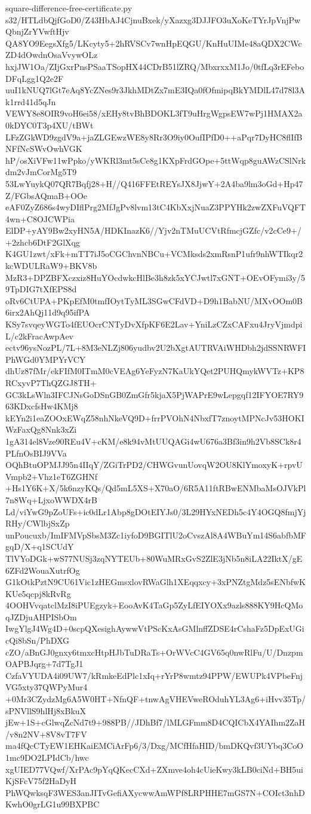 \documentclass[11pt]{article}
\theoremstyle{definition}
\theoremstyle{remark}
\begin{document}
\begin{filecontents*}[overwrite]{square-difference-free-certificate.py}
s32/HTLdbQjfGoD0/Z43HbAJ4CjnuBxek/yXazxg3DJJFO3uXoKeTYrJpVnjPwQbnjZrYVwftHjv
QA8YO9EegsXfg5/LKcyty5+2hRVSCv7wnHpEQGU/KnHuUIMe48aQDX2CWcZD4dOwdnOsaVvywOLz
hxjJW1Oa/ZIjGxrPnsPSaaTSopHX44CDrB51lZRQ/MbxrxxM1Jo/0tfLq3rEFeboDFqLgg1Q2e2F
uuI1kNUQ7lGt7eAq8YcZNes9r3JkhMDtZx7mE3IQa0fOfmipqBkYMDlL47d78l3Ak1rrd41d5qJn
VEWY8e8OIR9voH6ei58/xEHy8tvBhBDOKL3fT9uHrgWgpsEW7wPj1HMAX2a0kDYC0T3p4XU/tBWt
LFzZGkWD9zgdV9a+jaZLGEwzWE8y8Rr3O9iy0OufIPfD0++aPqr7DyHC8flIfBNFfNcSWvOwhVGK
hP/osXiVFw11wPpko/yWKRl3mt5sCe8g1KXpFrdGOpe+5ttWqp8guAWzCSlNrkdm2vJmCorMg5T9
53LwYuykQ07QR7Bqfj28+H//Q416FFEtREYsJX8JjwY+2A4ba9lm3oGd+Hp47Z/FGbsAQmaB+OOe
eAF0ZyZ686s4wyDIflPrg2MfJgPv8lvm13tC4KbXxjNuaZ3PPYHk2zwZXFuVQFT4wn+C8OJCWPia
ElDP+yAY9Bw2xyHN5A/HDKInazK6//Yjv2nTMuUCVtRfmcjGZfc/v2cCe9+/+2zhcb6DtF2GlXqg
K4GU1zwt/xFk+mTT7iJ5oCGChvnNBCu+VCMksds2xmRsnP1ufr9nhWTIkqr2kcWDULRaW9+BKV8b
MzR3+DPZBFXczxiz8HuYOcdwkcHlBe3h8zk5xYCJwtl7xGNT+OEvOFymi3y/59TpDIG7tXfEPS8d
oRv6CtUPA+PKpEfM0tmfIOytTyML3SGwCFdVD+D9h1BabNU/MXvOOm0B6irx2AhQj11d9q95ifPA
KSy7svqeyWGTo4fEUOcrCNTyDvXfpKF6E2Lav+YniLzCZxCAFxu4JryVjmdpiL/c2kFracAwpAev
ectv96ysNozPL/7L+8M3eNLZj806yudbv2U2bXgtAUTRVAiWHDbh2jdSSNRWFIPhWGd0YMPYrVCY
dhUz87fMr/ekFIfM0ITmM0cVEAg6YeFyzN7KaUkYQet2PUHQmykWVTz+KP8RCxyvP7ThQZGJ8TH+
GC3kLsWln3IFCJNsGoDSnGB0ZmGfr5kjaX5PjWAPrE9wLepgqf12IFYOE7RY963KDxcfsHw4KMj8
kEYn2i1eaZOOxEWqZ58nhNkeVQ9D+frrPVOhN4NbxfT7znoytMPNcJv53HOKIWzFaxQg8Nnk3xZi
1gA314el8Vze90REu4V+cKM/e8k94vMtUUQAGi4wU676a3Bf3in9h2Vb8SCk8r4PLfnOsBIJ9VVa
OQhBtuOPMJJ95n4IIqY/ZGiTrPD2/CHWGvunUovqW2OU8KlYmoxyK+rpvUVmpb2+Vhz1eT6ZGHNf
+Hs1Y6K+X/5k6nzyKQs/Qd5mL5XS+X70aO/6R5A11ftRBwENMbaMsOJVkPl7n8Wq+LjxoWWDX4rB
Ld/viYwG9pZoUFs+ic0dLr1Abp8gDOtEIYJs0/3L29HYxNEDh5c4Y4OGQ8fmjYjRHy/CWlbjSxZp
unPoucuxb/ImIFMVpSbsM3Zc1iyfoD9BGITlU2oCvszAl8A4WBuYm14S6abfbMFgqD/X+q1SCUdY
TlVYoDGk+wS77NUSj3zqNYTEUb+80WuMRxGvS2ZlE3jNb5n8iLA22IktX/gE6ZFd2WouaXutrfOg
G1kOtkPztN9CU61Vic1zHEGmsxlovRWaGlh1XEqqxcy+3xPNZtgMdz5sENbfwKKUe5qcpj8kRvRg
4OOHVvqatclMzI8iPUEgzyk+EooAvK4TaGp5ZyLfEIYOXx9azls888KY9HcQMoqJZDjuAHPISbOm
IwgYlgJ4Wg4D+0scpQXesighAywwVtPScKxAsGMlnffZDSE4rCshaFz5DpExUGicQi8bSn/PhDXG
cZO/aBnGJ0gnxy6tmxcHtpHJbTuDRaTs+OrWVcC4GV65q0nwRlFu/U/DnzpmOAPBJqrg+7d7TgJ1
CzfaVYUDA4i09UW7/kRmkeEdPlc1xIq+rYrP8wmtz94PPW/EWUPk4VPbeFnjVG5xty37QWPyMur4
+0Mr3CZydzMg6A5W0HT+NfnQF+tnwAgVHEVweROduhYL3Ag6+iHvv35Tp/sPNVllS9hlHj8xBkuX
jEw+1S+cGlwqZcNd7t9+988PB//JDhBf7/lMLGFmm8D4CQICbX4YAIhm2ZaH/v8n2NV+8V8vT7FV
ma4fQcCTyEW1EHKaiEMCiArFp6/3/Dxg/MCfHfaHID/bmDKQvf3UYbq3CoO1mc9DO2LPIdCb/hwc
xgUIED77VQwf/XrPAc9pYqQKecCXd+ZXmve4oh4cUieKwy3kLB0ciNd+BH5uiKjSFcV75f2HaDyH
PhWQwksqF3WES3anJITvGefiAXycwwAmWPf8LRPHHE7mGS7N+COIct3nhDKwhO0grLG1u99BXPBC

\end{filecontents*}
\end{document}
